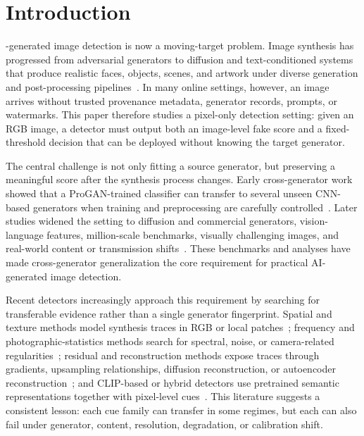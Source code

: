 \documentclass[lettersize,journal]{IEEEtran}
\begin{document}
\section{Introduction}
\label{sec:introduction}
-generated image detection is now a moving-target problem. Image synthesis has progressed from adversarial generators to diffusion and text-conditioned systems that produce realistic faces, objects, scenes, and artwork under diverse generation and post-processing pipelines~\cite{goodfellow2014gan,karras2019stylegan,ho2020ddpm,dhariwal2021diffusion,rombach2022ldm}. In many online settings, however, an image arrives without trusted provenance metadata, generator records, prompts, or watermarks. This paper therefore studies a pixel-only detection setting: given an RGB image, a detector must output both an image-level fake score and a fixed-threshold decision that can be deployed without knowing the target generator.

The central challenge is not only fitting a source generator, but preserving a meaningful score after the synthesis process changes. Early cross-generator work showed that a ProGAN-trained classifier can transfer to several unseen CNN-based generators when training and preprocessing are carefully controlled~\cite{wang2020cnnspot}. Later studies widened the setting to diffusion and commercial generators, vision-language features, million-scale benchmarks, visually challenging images, and real-world content or transmission shifts~\cite{ojha2023univfd,zhu2023genimage,zhong2023patchcraft,yan2025aide,li2025rrdataset}. These benchmarks and analyses have made cross-generator generalization the core requirement for practical AI-generated image detection.

Recent detectors increasingly approach this requirement by searching for transferable evidence rather than a single generator fingerprint. Spatial and texture methods model synthesis traces in RGB or local patches~\cite{wang2020cnnspot,liu2020gramnet,zhong2023patchcraft}; frequency and photographic-statistics methods search for spectral, noise, or camera-related regularities~\cite{frank2020frequency,liu2022realimages,karageorgiou2025spai,zhong2025beyond}; residual and reconstruction methods expose traces through gradients, upsampling relationships, diffusion reconstruction, or autoencoder reconstruction~\cite{tan2023lgrad,tan2024npr,wang2023dire,ricker2024aeroblade}; and CLIP-based or hybrid detectors use pretrained semantic representations together with pixel-level cues~\cite{radford2021clip,ojha2023univfd,cozzolino2024clip,yan2025aide,cheng2025cospy}. This literature suggests a consistent lesson: each cue family can transfer in some regimes, but each can also fail under generator, content, resolution, degradation, or calibration shift.
\end{document}
